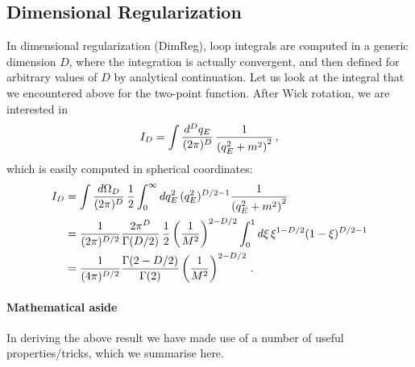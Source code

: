 \subsection{Dimensional Regularization}
\label{sec:dimens-regul}

In dimensional regularization (DimReg), loop integrals are computed in
a generic dimension $D$, where the integration is actually
convergent, and then defined for arbitrary values of $D$ by analytical
continuation. Let us look at the integral that we encountered above
for the two-point function. After Wick rotation, we are interested in
\begin{equation}
  \label{eq:FirstExDimReg}
  I_D = \int \frac{d^Dq_E}{(2\pi)^D}\, \frac{1}{\left(q_E^2+m^2\right)^2}\, ,
\end{equation}
which is easily computed in spherical coordinates:
\begin{align}
  I_D &= \int \frac{d\Omega_D}{(2\pi)^D}\,
        \frac12 \int_0^\infty dq_E^2\, (q_E^2)^{D/2-1} \frac{1}{\left(q_E^2+m^2\right)^2}
  \\
      &= \frac{1}{(2\pi)^{D/2}} \frac{2\pi^D}{\Gamma(D/2)}\,
        \frac12 \left(\frac{1}{M^2}\right)^{2-D/2} \int_0^1 d\xi \,
        \xi^{1-D/2} (1-\xi)^{D/2-1} \\
  \label{eq:IDResult}
      &= \frac{1}{(4\pi)^{D/2}} \frac{\Gamma(2-D/2)}{\Gamma(2)}
        \left(\frac{1}{M^2}\right)^{2-D/2}\, .
\end{align}

\paragraph{Mathematical aside}

In deriving the above result we have made use of a number of useful
properties/tricks, which we summarise here.


